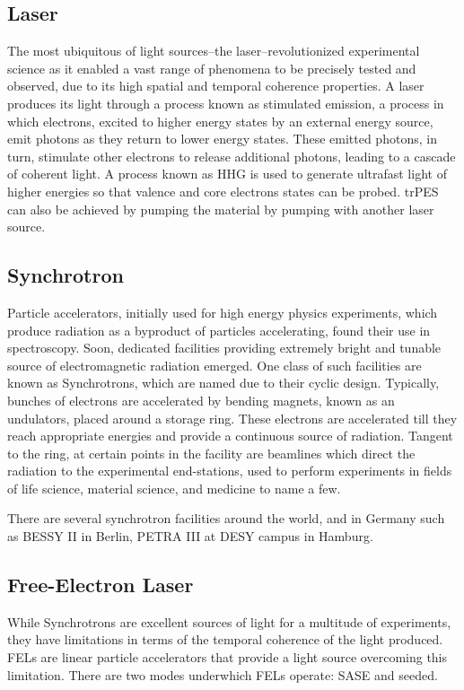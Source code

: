 \subsection{Laser}
The most ubiquitous of light sources--the laser--revolutionized experimental science as it enabled a vast range of phenomena to be precisely tested and observed, due to its high spatial and temporal coherence properties. A laser produces its light through a process known as stimulated emission, a process in which electrons, excited to higher energy states by an external energy source, emit photons as they return to lower energy states. These emitted photons, in turn, stimulate other electrons to release additional photons, leading to a cascade of coherent light. A process known as \gls{HHG} is used to generate ultrafast light of higher energies so that valence and core electrons states can be probed. \Gls{trPES} can also be achieved by pumping the material by pumping with another laser source.

\subsection{Synchrotron}
Particle accelerators, initially used for high energy physics experiments, which produce radiation as a byproduct of particles accelerating, found their use in spectroscopy. Soon, dedicated facilities providing extremely bright and tunable source of electromagnetic radiation emerged. One class of such facilities are known as Synchrotrons, which are named due to their cyclic design. Typically, bunches of electrons are accelerated by bending magnets, known as an \glspl{undulator}, placed around a storage ring. These electrons are accelerated till they reach appropriate energies and provide a continuous source of radiation. Tangent to the ring, at certain points in the facility are beamlines which direct the radiation to the experimental end-stations, used to perform experiments in fields of life science, material science, and medicine to name a few.

There are several synchrotron facilities around the world, and in Germany such as BESSY II in Berlin, PETRA III at DESY campus in Hamburg.

\subsection{Free-Electron Laser}
While Synchrotrons are excellent sources of light for a multitude of experiments, they have limitations in terms of the temporal coherence of the light produced. \Glspl{FEL} are linear particle accelerators that provide a light source overcoming this limitation. There are two modes underwhich \glspl{FEL} operate: \gls{SASE} and seeded.


